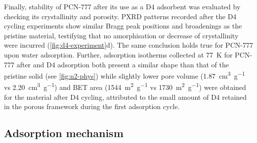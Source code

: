 Finally, stability of PCN-777 after its use as a D4 adsorbent was evaluated
by checking its crystallinity and porosity. PXRD patterns recorded after the D4
cycling experiments show similar Bragg peak positions and broadenings as the
pristine material, testifying that no amorphisation or decrease of
crystallinity were incurred (\cref{fig:d4-experiment}d). The same conclusion
holds true for PCN-777 upon water adsorption. Further,  adsorption
isotherms collected at \SI{77}{\kelvin} for PCN-777 after  and D4
adsorption both present a similar shape than that of the pristine solid (see
\cref{fig:n2-phys}) while slightly lower pore volume
(\SI{1.87}{\centi\metre\cubed\per\gram} vs
\SI{2.20}{\centi\metre\cubed\per\gram}) and BET area
(\SI{1544}{\metre\squared\per\gram} vs \SI{1730}{\metre\squared\per\gram}) were
obtained for the material after D4 cycling, attributed to the small amount of D4
retained in the porous framework during the first adsorption cycle.

\subsection{Adsorption mechanism}\label{adsorption-mechanism}

